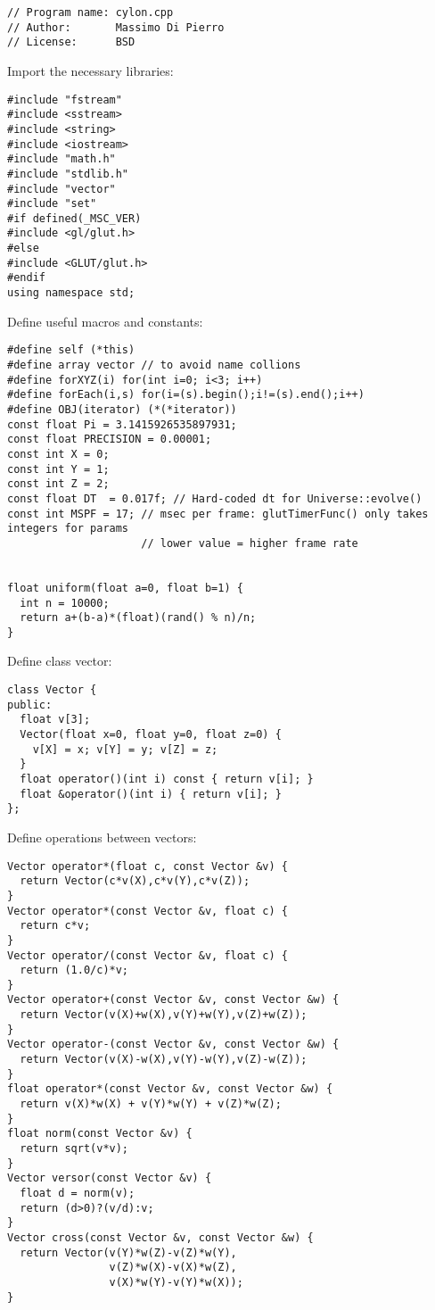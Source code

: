 \noindent
\begin{lstlisting}
// Program name: cylon.cpp
// Author:       Massimo Di Pierro
// License:      BSD
\end{lstlisting}
\noindent
Import the necessary libraries: \begin{lstlisting}
#include "fstream"
#include <sstream>
#include <string>
#include <iostream>
#include "math.h"
#include "stdlib.h"
#include "vector"
#include "set"
#if defined(_MSC_VER)
#include <gl/glut.h>
#else
#include <GLUT/glut.h>
#endif
using namespace std;
\end{lstlisting}
\noindent
Define useful macros and constants: \begin{lstlisting}
#define self (*this)
#define array vector // to avoid name collions
#define forXYZ(i) for(int i=0; i<3; i++)
#define forEach(i,s) for(i=(s).begin();i!=(s).end();i++)
#define OBJ(iterator) (*(*iterator))
const float Pi = 3.1415926535897931;
const float PRECISION = 0.00001;
const int X = 0;
const int Y = 1;
const int Z = 2;
const float DT  = 0.017f; // Hard-coded dt for Universe::evolve()
const int MSPF = 17; // msec per frame: glutTimerFunc() only takes integers for params
                     // lower value = higher frame rate


float uniform(float a=0, float b=1) {
  int n = 10000;
  return a+(b-a)*(float)(rand() % n)/n;
}
\end{lstlisting}
\noindent
Define class vector: \begin{lstlisting}
class Vector {
public:
  float v[3];
  Vector(float x=0, float y=0, float z=0) {
    v[X] = x; v[Y] = y; v[Z] = z;
  }
  float operator()(int i) const { return v[i]; }
  float &operator()(int i) { return v[i]; }
};
\end{lstlisting}
\noindent
Define operations between vectors: \begin{lstlisting}
Vector operator*(float c, const Vector &v) {
  return Vector(c*v(X),c*v(Y),c*v(Z));
}
Vector operator*(const Vector &v, float c) {
  return c*v;
}
Vector operator/(const Vector &v, float c) {
  return (1.0/c)*v;
}
Vector operator+(const Vector &v, const Vector &w) {
  return Vector(v(X)+w(X),v(Y)+w(Y),v(Z)+w(Z));
}
Vector operator-(const Vector &v, const Vector &w) {
  return Vector(v(X)-w(X),v(Y)-w(Y),v(Z)-w(Z));
}
float operator*(const Vector &v, const Vector &w) {
  return v(X)*w(X) + v(Y)*w(Y) + v(Z)*w(Z);
}
float norm(const Vector &v) {
  return sqrt(v*v);
}
Vector versor(const Vector &v) {
  float d = norm(v);
  return (d>0)?(v/d):v;
}
Vector cross(const Vector &v, const Vector &w) {
  return Vector(v(Y)*w(Z)-v(Z)*w(Y),
                v(Z)*w(X)-v(X)*w(Z),
                v(X)*w(Y)-v(Y)*w(X));
}
\end{lstlisting}
